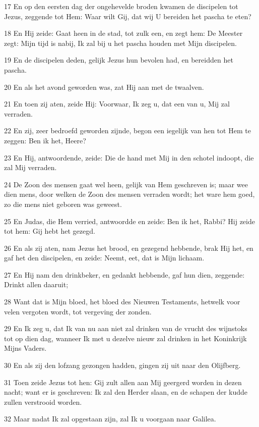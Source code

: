 \par 17 En op den eersten dag der ongehevelde broden kwamen de discipelen tot Jezus, zeggende tot Hem: Waar wilt Gij, dat wij U bereiden het pascha te eten?
\par 18 En Hij zeide: Gaat heen in de stad, tot zulk een, en zegt hem: De Meester zegt: Mijn tijd is nabij, Ik zal bij u het pascha houden met Mijn discipelen.
\par 19 En de discipelen deden, gelijk Jezus hun bevolen had, en bereidden het pascha.
\par 20 En als het avond geworden was, zat Hij aan met de twaalven.
\par 21 En toen zij aten, zeide Hij: Voorwaar, Ik zeg u, dat een van u, Mij zal verraden.
\par 22 En zij, zeer bedroefd geworden zijnde, begon een iegelijk van hen tot Hem te zeggen: Ben ik het, Heere?
\par 23 En Hij, antwoordende, zeide: Die de hand met Mij in den schotel indoopt, die zal Mij verraden.
\par 24 De Zoon des mensen gaat wel heen, gelijk van Hem geschreven is; maar wee dien mens, door welken de Zoon des mensen verraden wordt; het ware hem goed, zo die mens niet geboren was geweest.
\par 25 En Judas, die Hem verried, antwoordde en zeide: Ben ik het, Rabbi? Hij zeide tot hem: Gij hebt het gezegd.
\par 26 En als zij aten, nam Jezus het brood, en gezegend hebbende, brak Hij het, en gaf het den discipelen, en zeide: Neemt, eet, dat is Mijn lichaam.
\par 27 En Hij nam den drinkbeker, en gedankt hebbende, gaf hun dien, zeggende: Drinkt allen daaruit;
\par 28 Want dat is Mijn bloed, het bloed des Nieuwen Testaments, hetwelk voor velen vergoten wordt, tot vergeving der zonden.
\par 29 En Ik zeg u, dat Ik van nu aan niet zal drinken van de vrucht des wijnstoks tot op dien dag, wanneer Ik met u dezelve nieuw zal drinken in het Koninkrijk Mijns Vaders.
\par 30 En als zij den lofzang gezongen hadden, gingen zij uit naar den Olijfberg.
\par 31 Toen zeide Jezus tot hen: Gij zult allen aan Mij geergerd worden in dezen nacht; want er is geschreven: Ik zal den Herder slaan, en de schapen der kudde zullen verstrooid worden.
\par 32 Maar nadat Ik zal opgestaan zijn, zal Ik u voorgaan naar Galilea.
